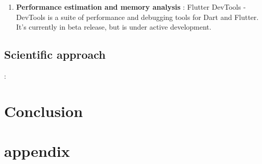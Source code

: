 \documentclass{article}
\begin{document}
\begin{enumerate}
\item \textbf{Performance estimation and memory analysis} : Flutter DevTools - DevTools is a suite of performance and debugging tools for Dart and Flutter. It’s currently in beta release, but is under active development.
\end{enumerate}

\subsection{Scientific approach} : 

\section{Conclusion }

\section{appendix }
\end{document}
